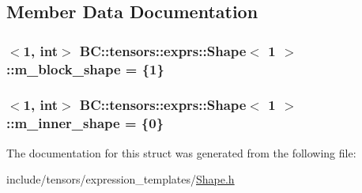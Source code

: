 \subsection{Member Data Documentation}
\subsubsection[{\texorpdfstring{m\+\_\+block\+\_\+shape}{m_block_shape}}]{$<$1, int$>$ {\bf B\+C\+::tensors\+::exprs\+::\+Shape}$<$ 1 $>$\+::m\+\_\+block\+\_\+shape = \{1\}}\hypertarget{structBC_1_1tensors_1_1exprs_1_1Shape_3_011_01_4_ab3b8eb8beb7e2bce0fc54fbf30725948}{}\label{structBC_1_1tensors_1_1exprs_1_1Shape_3_011_01_4_ab3b8eb8beb7e2bce0fc54fbf30725948}
\subsubsection[{\texorpdfstring{m\+\_\+inner\+\_\+shape}{m_inner_shape}}]{$<$1, int$>$ {\bf B\+C\+::tensors\+::exprs\+::\+Shape}$<$ 1 $>$\+::m\+\_\+inner\+\_\+shape = \{0\}}\hypertarget{structBC_1_1tensors_1_1exprs_1_1Shape_3_011_01_4_ac47435e60acef4b09ab2a8a67354a240}{}\label{structBC_1_1tensors_1_1exprs_1_1Shape_3_011_01_4_ac47435e60acef4b09ab2a8a67354a240}


The documentation for this struct was generated from the following file\+:\begin{DoxyCompactItemize}
\item 
include/tensors/expression\+\_\+templates/\hyperlink{Shape_8h}{Shape.\+h}\end{DoxyCompactItemize}
